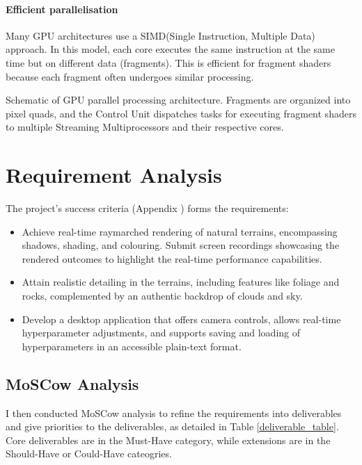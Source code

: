 \paragraph{Efficient parallelisation}
Many GPU architectures use a SIMD(Single Instruction, Multiple Data) approach. In this model, each core executes the same instruction at the same time but on different data (fragments). This is efficient for fragment shaders because each fragment often undergoes similar processing.

{Schematic of GPU parallel processing architecture. Fragments are organized into pixel quads, and the Control Unit dispatches tasks for executing fragment shaders to multiple Streaming Multiprocessors and their respective cores.}

\section{Requirement Analysis}
\label{sec:Requirement}

The project’s success criteria (Appendix ) forms the requirements:

\begin{itemize}
    \item Achieve real-time raymarched rendering of natural terrains, encompassing shadows, shading, and colouring. Submit screen recordings showcasing the rendered outcomes to highlight the real-time performance capabilities.
    \item Attain realistic detailing in the terrains, including features like foliage and rocks, complemented by an authentic backdrop of clouds and sky.
    \item Develop a desktop application that offers camera controls, allows real-time hyperparameter adjustments, and supports saving and loading of hyperparameters in an accessible plain-text format.
\end{itemize}

\subsection{MoSCow Analysis}

I then conducted MoSCow analysis to refine the requirements into deliverables and give priorities to the deliverables, as detailed in Table \ref{deliverable_table}. Core deliverables are in the Must-Have category, while extensions are in the Should-Have or Could-Have cateogries. 

